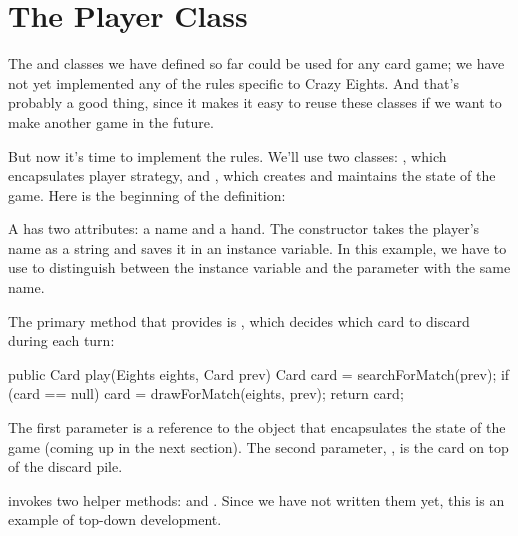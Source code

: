 

\section{The Player Class}

The  and  classes we have defined so far could be used for any card game; we have not yet implemented any of the rules specific to Crazy Eights.
And that's probably a good thing, since it makes it easy to reuse these classes if we want to make another game in the future.

But now it's time to implement the rules.
We'll use two classes: , which encapsulates player strategy, and , which creates and maintains the state of the game.
Here is the beginning of the  definition:


\begin{code}
public class Player {

    private String name;
    private Hand hand;

    public Player(String name) {
        this.name = name;
        this.hand = new Hand(name);
    }
\end{code}

A  has two  attributes: a name and a hand.
The constructor takes the player's name as a string and saves it in an instance variable.
In this example, we have to use  to distinguish between the instance variable and the parameter with the same name.

The primary method that  provides is , which decides which card to discard during each turn:

\begin{code}
public Card play(Eights eights, Card prev) {
    Card card = searchForMatch(prev);
    if (card == null) {
        card = drawForMatch(eights, prev);
    }
    return card;
}
\end{code}

The first parameter is a reference to the  object that encapsulates the state of the game (coming up in the next section).
The second parameter, , is the card on top of the discard pile.

 invokes two helper methods:  and .
Since we have not written them yet, this is an example of top-down development.

